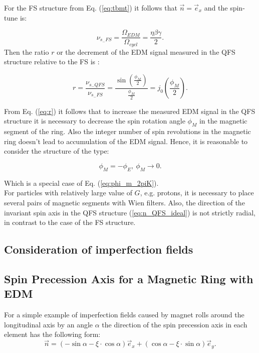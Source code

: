 For the FS structure \cite{Farley:2004hp} from Eq. (\ref{eq:tbmt}) it follows that $\vec{n}=\vec{e}_x$ and the spin-tune is:

\begin{equation}
	\nu_{s_{-}FS}=\frac{\Omega_{EDM}}{\Omega_{cycl}}=\frac{\eta\beta\gamma}{2}.
\end{equation}  
Then the ratio $r$ or the decrement of the EDM signal measured in the QFS structure relative to the FS is \cite{Melnikov:2025gdj}:

\begin{equation}\label{eq:r}
	r=\frac{\nu_{s_{-}QFS}}{\nu_{s_{-}FS}}=\frac{\sin\left(\frac{\phi_M}{2}\right)}{\frac{\phi_M}{2}}=j_0\left(\frac{\phi_M}{2}\right).
\end{equation} 

From Eq. (\ref{eq:r}) it follows that to increase the measured EDM signal in the QFS structure it is necessary to decrease the spin rotation angle $\phi_M$
in the magnetic segment of the ring. Also the integer number of spin revolutions in the magnetic ring doesn't lead to accumulation of the EDM signal. Hence, it is reasonable to consider the structure of the type:

\begin{equation}\label{eq:QFS_condition}
	\phi_M=-\phi_E,~\phi_M \to 0.
\end{equation} 

Which is a special case of Eq. (\ref{eq:phi_m_2piK}).\\
For particles with relatively large value of $G$, e.g. protons, it is necessary to place several pairs of magnetic segments with Wien filters. Also, the direction of the invariant spin axis in the QFS structure (\ref{eq:n_QFS_ideal}) is not strictly radial, in contrast to the case of the FS structure. 






\subsection{Consideration of imperfection fields}
\subsection{Spin Precession Axis for a Magnetic Ring with EDM}
For a simple example of imperfection fields caused by magnet rolls around the longitudinal axis by an angle $\alpha$ the direction of the spin precession axis in each element has the following form:
\begin{equation}\label{}
	\vec{n}=\left(-\sin\alpha-\xi \cdot \cos \alpha\right)\vec{e}_x+\left(\cos\alpha-\xi \cdot \sin \alpha\right)\vec{e}_y.
\end{equation} 

